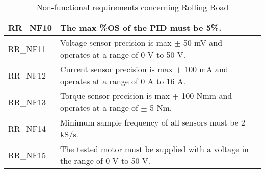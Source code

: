\begin{table}[h!]
\begin{tabular}{|p{2 cm}|p{10 cm}|p{2 cm}|}
		RR\_NF10
		& The max \%OS of the PID must be 5\%. 
		&  \\ \hline
		RR\_NF11
		& Voltage sensor precision is max $\pm$ 50 mV and operates at a range of 0 V to 50 V. 
		&  \\ \hline
		RR\_NF12
		& Current sensor precision is max $\pm$ 100 mA and operates at a range of 0 A to 16 A. 
		&  \\ \hline
		RR\_NF13
		& Torque sensor precision is max $\pm$ 100 Nmm and operates at a range of $\pm$ 5 Nm. 
		&  \\ \hline
		RR\_NF14
		& Minimum sample frequency of all sensors must be 2 kS/s.  
		&  \\ \hline
		RR\_NF15
		& The tested motor must be supplied with a voltage in the range of 0 V to 50 V.
		&  \\ \hline
	\end{tabular}
	\caption{Non-functional requirements concerning Rolling Road}
\end{table}


